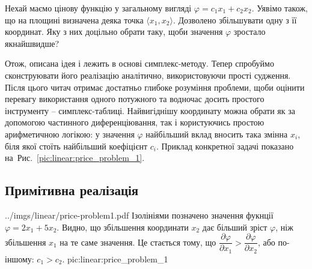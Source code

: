 \documentclass[\main/book.tex]{subfiles}
\begin{document}
Нехай маємо цінову функцію у загальному вигляді $\varphi = c_1 x_1 + c_2 x_2$. Уявімо також, що на площині визначена деяка точка ${\langle x_1, x_2 \rangle}$. Дозволено збільшувати одну з її координат. Яку з них доцільно обрати таку, щоби значення $\varphi$ зростало якнайшвидше?

Отож, описана ідея і лежить в основі симплекс-методу. Тепер спробуймо сконструювати його реалізацію аналітично, використовуючи прості судження. Після цього читач отримає достатньо глибоке розуміння проблеми, щоби оцінити перевагу використання одного потужного та водночас досить простого інструменту -- симплекс-таблиці.
\flqq{}Найвигіднішу\frqq{} координату можна обрати як за допомогою частинного диференціювання, так і користуючись простою арифметичною логікою: у значення $\varphi$ найбільший вклад вносить така змінна $x_i$, біля якої стоїть найбільший коефіцієнт $c_i$. Приклад конкретної задачі показано на~Рис.~\ref{pic:linear:price_problem_1}.

\subsection{Примітивна реалізація}

\illustration
 {../imgs/linear/price-problem1.pdf}
 {Ізолініями позначено значення фукнції $\varphi = 2 x_1 + 5 x_2$. Видно, що збільшення координати $x_2$ дає більший зріст $\varphi$, ніж збільшення $x_1$ на те саме значення. Це стається тому, що $\dfrac{\partial\varphi}{\partial x_1} > \dfrac{\partial\varphi}{\partial x_2}$, або по-іншому: $c_1 > c_2$.}
 {pic:linear:price_problem_1}
\end{document}
